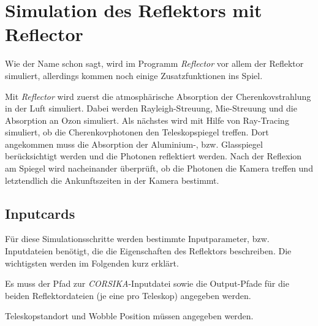 % 

\section{Simulation des Reflektors mit Reflector}
\label{sec:Reflector}
Wie der Name schon sagt, wird im Programm \textit{Reflector} vor allem der Reflektor simuliert, allerdings kommen noch einige Zusatzfunktionen ins Spiel.

Mit \textit{Reflector} wird zuerst die atmosphärische Absorption der Cherenkovstrahlung in der Luft simuliert. 
Dabei werden Rayleigh-Streuung, Mie-Streuung und die Absorption an Ozon simuliert.
Als nächstes wird mit Hilfe von Ray-Tracing simuliert, ob die Cherenkovphotonen den Teleskopspiegel treffen.
Dort angekommen muss die Absorption der Aluminium-, bzw. Glasspiegel berücksichtigt werden und die Photonen reflektiert werden.
Nach der Reflexion am Spiegel wird nacheinander überprüft, ob die Photonen die Kamera treffen und letztendlich die Ankunftszeiten in der Kamera bestimmt.

\subsection{Inputcards}
Für diese Simulationsschritte werden bestimmte Inputparameter, bzw. Inputdateien benötigt, die die Eigenschaften des Reflektors beschreiben.
Die wichtigsten werden im Folgenden kurz erklärt.

Es muss der Pfad zur \textit{CORSIKA}-Inputdatei sowie die Output-Pfade für die beiden Reflektordateien (je eine pro Teleskop) angegeben werden.

Teleskopstandort und Wobble Position müssen angegeben werden.

